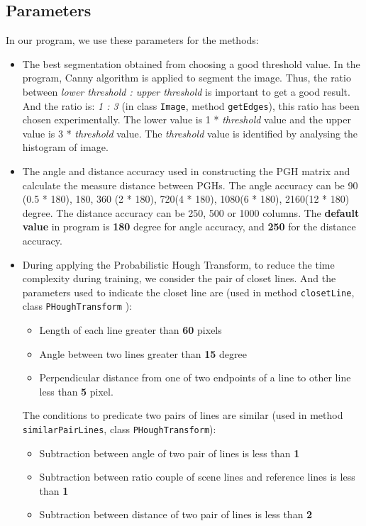 \subsection{Parameters}
In our program, we use these parameters for the methods:
\begin{itemize}
\item The best segmentation obtained from choosing a good threshold value. In the program, Canny algorithm is applied to segment the image. Thus, the ratio between \textit{lower threshold : upper threshold} is important to get a good result. And the ratio is: \textit{1 : 3} (in class \texttt{Image}, method \texttt{getEdges}), this ratio has been chosen experimentally. The lower value is 1 * \textit{threshold} value and the upper value is 3 * \textit{threshold} value. The \textit{threshold} value is identified by analysing the histogram of image. 
\item The angle and distance accuracy used in constructing the PGH matrix and calculate the measure distance between PGHs. The angle accuracy can be 90 (0.5 * 180), 180, 360 (2 * 180), 720(4 * 180), 1080(6 * 180), 2160(12 * 180) degree. The distance accuracy can be 250, 500 or 1000 columns. The \textbf{default value} in program is \textbf{180} degree for angle accuracy, and \textbf{250} for the distance accuracy. 
\item During applying the Probabilistic Hough Transform, to reduce the time complexity during training, we consider the pair of closet lines. And the parameters used to indicate the closet line are (used in method \texttt{closetLine}, class \texttt{PHoughTransform} ):
	\begin{itemize}
		\item Length of each line greater than \textbf{60} pixels
		\item Angle between two lines greater than \textbf{15} degree
		\item Perpendicular distance from one of two endpoints of a line to other line less than \textbf{5} pixel.
	\end{itemize}
The conditions to predicate two pairs of lines are similar (used in method \texttt{similarPairLines}, class \texttt{PHoughTransform}):
	\begin{itemize}
		\item Subtraction between angle of two pair of lines is less than \textbf{1}
		\item Subtraction between ratio couple of scene lines and reference lines is less than \textbf{1}
		\item Subtraction between distance of two pair of lines is less than \textbf{2}

\end{itemize}
\end{itemize}
